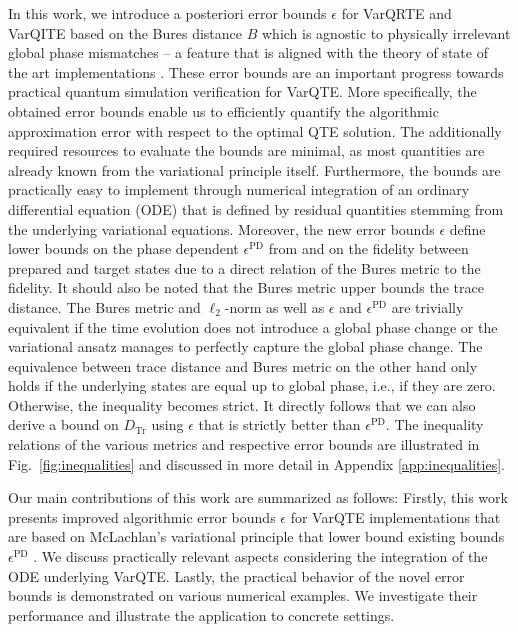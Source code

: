 \documentclass[twocolumn, aps, pra, superscriptaddress]{revtex4-1}
\begin{document}
In this work, we introduce a posteriori error bounds $\epsilon$ for VarQRTE and VarQITE based on the Bures distance $B$ which is agnostic to physically irrelevant global phase mismatches -- a feature that is aligned with the theory of state of the art implementations \cite{Simon18TheoryVarQSim}.
These error bounds are an important progress towards practical quantum simulation verification for VarQTE.
More specifically, the obtained error bounds enable us to efficiently quantify the algorithmic approximation error with respect to the optimal QTE solution.
The additionally required resources to evaluate the bounds are minimal, as most quantities are already known from the variational principle itself.
Furthermore, the bounds are practically easy to implement through numerical integration of an ordinary differential equation (ODE) that is defined by residual quantities stemming from the underlying variational equations. 
Moreover, the new error bounds $\epsilon$ define lower bounds on the phase dependent $\epsilon^{\text{PD}}$ from \cite{Endo_2020VarQTEGeneralProcesses, MartinazzoErrorVarQuantumDyn20} and on the fidelity between prepared and target states due to a direct relation of the Bures metric to the fidelity.
It should also be noted that the Bures metric upper bounds the trace distance.
The Bures metric and $\ell_2$-norm as well as $\epsilon$ and $\epsilon^{\text{PD}}$ are trivially equivalent if the time evolution does not introduce a global phase change or the variational ansatz manages to perfectly capture the global phase change.
The equivalence between trace distance and Bures metric on the other hand only holds if the underlying states are equal up to global phase, i.e., if they are zero. Otherwise, the inequality becomes strict.
It directly follows that we can also derive a bound on $D_{\mathrm{Tr}}$ using $\epsilon$ that is strictly better than $\epsilon^{\text{PD}}$.
The inequality relations of the various metrics and respective error bounds are illustrated in Fig.~\ref{fig:inequalities} and discussed in more detail in Appendix \ref{app:inequalities}.


Our main contributions of this work are summarized as follows: Firstly, this work presents improved algorithmic error bounds $\epsilon$ for VarQTE implementations that are based on McLachlan's variational principle that lower bound existing bounds $\epsilon^\text{PD}$ \cite{MartinazzoErrorVarQuantumDyn20, Endo_2020VarQTEGeneralProcesses}.
We discuss practically relevant aspects considering the integration of the ODE underlying VarQTE. 
Lastly, the practical behavior of the novel error bounds is demonstrated on various numerical examples. We investigate their performance and illustrate the application to concrete settings.
\end{document}
